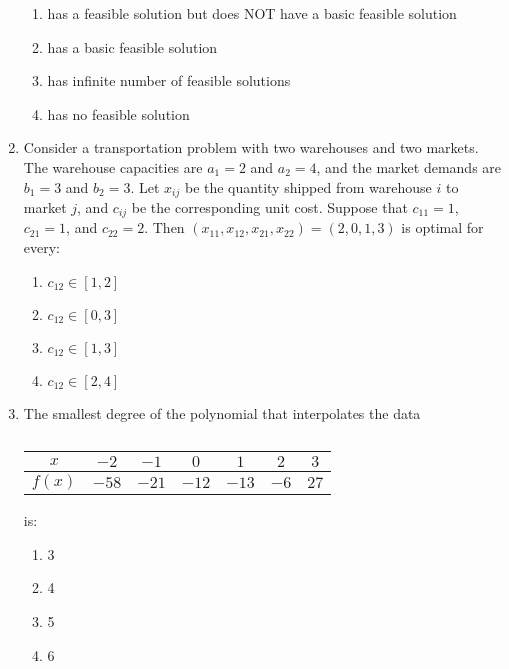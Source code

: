 \documentclass[journal]{IEEEtran}
\numberwithin{equation}{enumi}
\numberwithin{figure}{enumi}
\begin{document}
\begin{enumerate}
    \begin{enumerate}
        \item has a feasible solution but does NOT have a basic feasible solution
        \item has a basic feasible solution
        \item has infinite number of feasible solutions
        \item has no feasible solution
    \end{enumerate}
    
\item  Consider a transportation problem with two warehouses and two markets. The warehouse capacities are $a_1 = 2$ and $a_2 = 4$, and the market demands are $b_1 = 3$ and $b_2 = 3$. Let $x_{ij}$ be the quantity shipped from warehouse $i$ to market $j$, and $c_{ij}$ be the corresponding unit cost. Suppose that $c_{11} = 1$, $c_{21} = 1$, and $c_{22} = 2$. Then $(x_{11}, x_{12}, x_{21}, x_{22}) = (2, 0, 1, 3)$ is optimal for every:
\hfill{}
\begin{multicols}{2}
    \begin{enumerate}
        \item $c_{12} \in [1, 2]$
        \item $c_{12} \in [0, 3]$
        \item  $c_{12} \in [1, 3]$
        \item $c_{12} \in [2, 4]$
    \end{enumerate}
    \end{multicols}


\item The smallest degree of the polynomial that interpolates the data

\begin{table}[ht]
\centering
\begin{tabular}{|c|c|c|c|c|c|c|}
\hline      
$x$     & $-2$ & $-1$ & $0$ & $1$ & $2$ & $3$ \\
\hline
$f(x)$  & $-58$ & $-21$ & $-12$ & $-13$ & $-6$ & $27$ \\
\hline

\end{tabular}
\caption{}
\label{tab:Q51}
\end{table}


    is:   \hfill{}
 \begin{multicols}{4}
\begin{enumerate}
    \item 3
    \item 4
    \item 5
    \item 6
\end{enumerate}
\end{multicols}



\end{enumerate}
\end{document}
